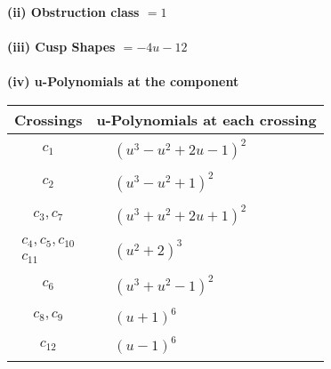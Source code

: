 \documentclass[1p]{elsarticle_modified}
\theoremstyle{definition}
\begin{document}
\flushleft \textbf{(ii) Obstruction class $= 1$}\\~\\
\flushleft \textbf{(iii) Cusp Shapes $= -4 u-12$}\\~\\
\newpage\renewcommand{\arraystretch}{1}
\flushleft \textbf{(iv) u-Polynomials at the component}\newline \\
\begin{tabular}{m{50pt}|m{274pt}}
Crossings & \hspace{64pt}u-Polynomials at each crossing \\
\hline $$\begin{aligned}c_{1}\end{aligned}$$&$\begin{aligned}
&(u^3- u^2+2 u-1)^2
\end{aligned}$\\
\hline $$\begin{aligned}c_{2}\end{aligned}$$&$\begin{aligned}
&(u^3- u^2+1)^2
\end{aligned}$\\
\hline $$\begin{aligned}c_{3},c_{7}\end{aligned}$$&$\begin{aligned}
&(u^3+u^2+2 u+1)^2
\end{aligned}$\\
\hline $$\begin{aligned}c_{4},c_{5},c_{10}\\c_{11}\end{aligned}$$&$\begin{aligned}
&(u^2+2)^3
\end{aligned}$\\
\hline $$\begin{aligned}c_{6}\end{aligned}$$&$\begin{aligned}
&(u^3+u^2-1)^2
\end{aligned}$\\
\hline $$\begin{aligned}c_{8},c_{9}\end{aligned}$$&$\begin{aligned}
&(u+1)^6
\end{aligned}$\\
\hline $$\begin{aligned}c_{12}\end{aligned}$$&$\begin{aligned}
&(u-1)^6
\end{aligned}$\\
\hline
\end{tabular}\\~\\
\end{document}
